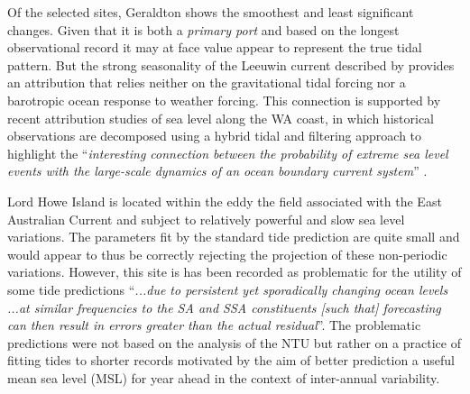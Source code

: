 Of the selected sites, Geraldton shows the smoothest and least significant changes.  Given that it is both a \textit{primary port} and based on the longest observational record it may at face value appear to represent the true tidal pattern. But the strong seasonality of the Leeuwin current described by \citeauthor{Ridgway:2004kb} provides an attribution that relies neither on the gravitational tidal forcing nor a barotropic ocean response to weather forcing. %
This connection is supported by recent attribution studies of sea level along the WA coast, in which historical observations are decomposed using a hybrid tidal and filtering approach to highlight the ``\textit{interesting connection between the probability of extreme sea level events with the large-scale dynamics of an ocean boundary current system}'' \citep{10.1029/2020ef001620}.

Lord Howe Island is located within the eddy the field associated with the East Australian Current and subject to relatively powerful and slow sea level variations.    The parameters fit by the standard tide prediction are quite small and would appear to thus be correctly rejecting the projection of these  non-periodic variations.   However, this site is has been recorded as problematic for the utility of some tide predictions ``\textit{...due to persistent yet sporadically changing ocean levels ...at similar frequencies to the SA and SSA constituents [such that] forecasting can then result in errors greater than the actual residual}''\citep{MHL2156}.  The problematic predictions were not based on the analysis of the NTU but rather on a practice of fitting tides to shorter records motivated by the aim of better prediction a useful mean sea level (MSL) for year ahead in the context of inter-annual variability.

